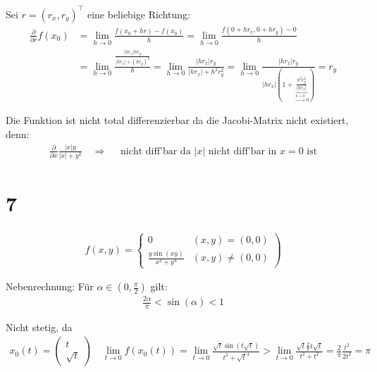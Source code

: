 \documentclass[11pt,a4paper]{article}
\newcommand{\1}    	{\mathbbm{1}}
\begin{document}
	\noindent
	Sei \(r = (r_x, r_y)^\top\) eine beliebige Richtung:
	\begin{align*}
		\frac{\partial}{\partial r} f(x_0) &= 
		\lim_{h \rightarrow 0} \frac{f(x_0 + h r) - f(x_0)}{h} =
		\lim_{h \rightarrow 0} \frac{f(0 + h r_x, 0 + h r_y) - 0}{h} \\
		&= \lim_{h \rightarrow 0} \frac{\frac{\vert h r_x \vert h r_y}{\vert h r_x \vert + \left( h r_y \right)^2}}{h} =
		\lim_{h \rightarrow 0} \frac{\vert h r_x \vert  r_y}{\vert h r_x \vert + h^2 r_y^2} =
		\lim_{h \rightarrow 0} \frac{\vert h r_x \vert r_y}{\vert h r_x \vert ( 1 + \underbrace{\frac{h^2 r_y^2}{\vert h r_x \vert}}_{\stackrel{h \rightarrow 0}{\rightarrow} 0})} = r_y
	\end{align*}
	
	\noindent
	Die Funktion ist nicht total differenzierbar da die Jacobi-Matrix nicht existiert, denn:
	\begin{align*}
		\frac{\partial}{\partial x} \frac{\vert x \vert y}{\vert x \vert + y^2} \quad \Rightarrow \quad \textrm{ nicht diff'bar da } \vert x \vert \textrm{ nicht diff'bar in } x = 0 \textrm{ ist}
	\end{align*}
	
	\section*{7}	
	\begin{align*}
		f(x,y) = \left\{ \begin{array}{ll}
			0 & (x,y) = (0,0) \\
			\frac{y \sin(xy)}{x^2 + y^4} & (x,y) \neq (0,0)
		\end{array} \right)
	\end{align*}	
	
	Nebenrechnung: Für \(\alpha \in (0,\frac{\pi}{2}) \) gilt:
	\begin{align*}
		\frac{2 \alpha}{\pi} < \sin(\alpha) < 1
	\end{align*}
	
	Nicht stetig, da
	\begin{align*}
		x_0(t) = \left( \begin{array}{c}
			t \\ \sqrt{t}
		\end{array}	\right) \quad
		\lim_{t \rightarrow 0} f(x_0(t)) = 
		\lim_{t \rightarrow 0} \frac{\sqrt{t} \sin(t \sqrt{t})}{t^2 + \sqrt{t}^4} > \lim_{t \rightarrow 0} \frac{\sqrt{t} \frac{2}{\pi}t\sqrt{t}}{t^2 + t^2} = \frac{2}{\pi} \frac{t^2}{2t^2} = \pi
	\end{align*}		
	
\end{document}
